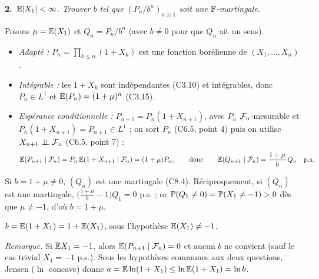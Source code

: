 \documentclass[11pt,a4paper]{article}
\newcommand{\question}[2]{\par\medskip\noindent\textbf{#1}~\textit{#2}\par\smallskip}
\begin{document}
\begin{exo}
\question{2.}{$\mathbb{E}|X_1|<\infty$. Trouver $b$ tel que $(P_n/b^n)_{n\ge1}$ soit une $\mathbb{F}$-martingale.}
Posons $\mu=\mathbb{E}(X_1)$ et $Q_n=P_n/b^n$ (avec $b\neq0$ pour que $Q_n$ ait un sens).
\begin{itemize}
  \item \emph{Adapté :} $P_n=\prod_{k\le n}(1+X_k)$ est une fonction borélienne de $(X_1,\dots,X_n)$.
  \item \emph{Intégrable :} les $1+X_k$ sont indépendantes (C3.10) et intégrables, donc $P_n\in L^1$ et $\mathbb{E}(P_n)=(1+\mu)^n$ (C3.15).
  \item \emph{Espérance conditionnelle :} $P_{n+1}=P_n(1+X_{n+1})$, avec $P_n$ $\mathcal{F}_n$-mesurable et $P_n(1+X_{n+1})=P_{n+1}\in L^1$ ; on
  sort $P_n$ (C6.5, point 4) puis on utilise $X_{n+1}\perp\!\!\!\perp\mathcal{F}_n$ (C6.5, point 7) :
  \[\mathbb{E}(P_{n+1}\mid\mathcal{F}_n)=P_n\,\mathbb{E}(1+X_{n+1}\mid\mathcal{F}_n)=(1+\mu)P_n,\qquad\text{donc}\qquad\mathbb{E}(Q_{n+1}\mid\mathcal{F}_n)=\frac{1+\mu}{b}\,Q_n\quad\text{p.s.}\]
\end{itemize}
Si $b=1+\mu\neq0$, $(Q_n)$ est une martingale (C8.4). Réciproquement, si $(Q_n)$ est une martingale,
$\bigl(\frac{1+\mu}b-1\bigr)Q_1=0$ p.s. ; or $\mathbb{P}(Q_1\neq0)=\mathbb{P}(X_1\neq-1)>0$ dès que $\mu\neq-1$, d'où $b=1+\mu$.
\begin{resultat}$b=\mathbb{E}(1+X_1)=1+\mathbb{E}(X_1)$, sous l'hypothèse $\mathbb{E}(X_1)\neq-1$.\end{resultat}
\textit{Remarque.} Si $\mathbb{E} X_1=-1$, alors $\mathbb{E}(P_{n+1}\mid\mathcal{F}_n)=0$ et aucun $b$ ne convient (sauf le cas trivial $X_1=-1$ p.s.).
Sous les hypothèses communes aux deux questions, Jensen ($\ln$ concave) donne $a=\mathbb{E}\ln(1+X_1)\le\ln\mathbb{E}(1+X_1)=\ln b$.
\end{exo}
\end{document}
